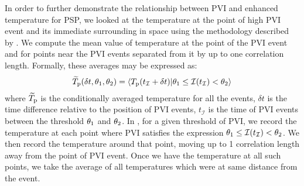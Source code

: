         In order to further demonstrate the relationship between PVI and enhanced temperature for
        PSP, we looked at the temperature at the point of high PVI event and its immediate
        surrounding in space using the methodology described by \citet{Osman2012a}. We compute the
        mean value of temperature at the point of the PVI event and for points near the PVI events
        separated from it by up to one correlation length. Formally, these averages may be expressed
        as:
        \begin{align}
            \widetilde{T}_{\rm p}( \delta t, \theta_{\rm 1}, \theta_{\rm 2}) = \langle T_{\rm p}(t_{\mathcal{I}}+\delta t)| \theta_{\rm 1} \leq \mathcal{I}(t_\mathcal{I}) < \theta_{\rm 2} \rangle \label{eq:tts}
        \end{align}
        where $\widetilde{T}_{\rm p}$ is the conditionally averaged temperature for all the events,
        $\delta t$ is the time difference relative to the position of PVI events, $t_\mathcal{I}$ is
        the time of PVI events between the threshold $\theta_{\rm 1}$ and $\theta_{\rm 2}$. In
        , for a given threshold of PVI, we record the temperature at each point where
        PVI satisfies the expression $\theta_{\rm 1} \leq \mathcal{I}(t_\mathcal{I}) < \theta_{\rm
        2}$. We then record the temperature around that point, moving up to 1 correlation length
        away from the point of PVI event. Once we have the temperature at all such points, we take
        the average of all temperatures which were at same distance from the event.

